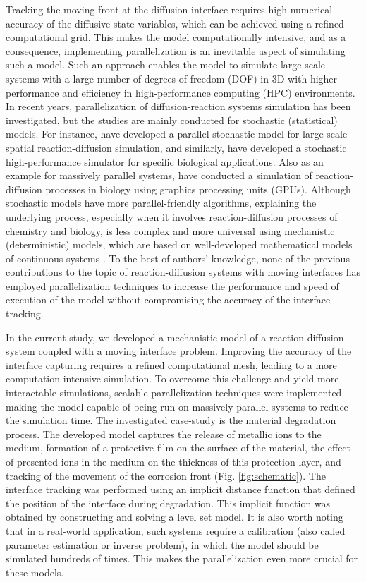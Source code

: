 Tracking the moving front at the diffusion interface requires high numerical accuracy of the diffusive state variables, which can be achieved using a refined computational grid. This makes the model computationally intensive, and as a consequence, implementing parallelization is an inevitable aspect of simulating such a model.  Such an approach enables the model to simulate large-scale systems with a large number of degrees of freedom (\gls{DOF}) in 3D with higher performance and efficiency in high-performance computing (\gls{HPC}) environments. In recent years, parallelization of diffusion-reaction systems simulation has been investigated, but the studies are mainly conducted for stochastic (statistical) models. For instance, \cite{Chen2017} have developed a parallel stochastic model for large-scale spatial reaction-diffusion simulation, and similarly, \cite{Arjunan2020} have developed a stochastic high-performance simulator for specific biological applications. Also as an example for massively parallel systems, \cite{Hallock2014} have conducted a simulation of reaction-diffusion processes in biology using graphics processing units (\gls{GPU}s). Although stochastic models have more parallel-friendly algorithms, explaining the underlying process, especially when it involves reaction-diffusion processes of chemistry and biology, is less complex and more universal using mechanistic (deterministic) models, which are based on well-developed mathematical models of continuous systems \cite{Kendall1999}. To the best of authors' knowledge, none of the previous contributions to the topic of reaction-diffusion systems with moving interfaces has employed parallelization techniques to increase the performance and speed of execution of the model without compromising the accuracy of the interface tracking.

In the current study, we developed a mechanistic model of a reaction-diffusion system coupled with a moving interface problem. Improving the accuracy of the interface capturing requires a refined computational mesh, leading to a more computation-intensive simulation. To overcome this challenge and yield more interactable simulations, scalable  parallelization techniques were implemented making the model capable of being run on massively parallel systems to reduce the simulation time. The investigated case-study is the
material degradation process. The developed model captures the release of metallic ions to the medium, formation of a protective film on the surface of the material, the effect of presented ions in the medium on the thickness of this protection layer, and tracking of the movement of the corrosion front (Fig. \ref{fig:schematic}). The interface tracking was performed using an implicit distance function that defined the position of the interface during degradation. This implicit function was obtained by constructing and solving a level set model. It is also worth noting that in a real-world application, such systems require a calibration (also called parameter estimation or inverse problem), in which the model should be simulated hundreds of times. This makes the parallelization even more crucial for these models.



